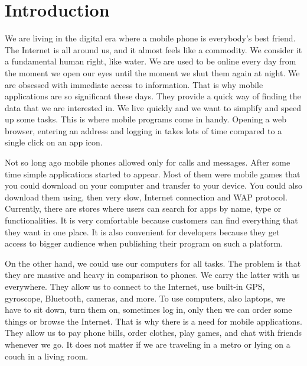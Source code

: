 \chapter{Introduction}
We are living in the digital era where a mobile phone is everybody's best friend. The Internet is all around us, and it almost feels like a commodity. We consider it a fundamental human right, like water. We are used to be online every day from the moment we open our eyes until the moment we shut them again at night. We are obsessed with immediate access to information. That is why mobile applications are so significant these days. They provide a quick way of finding the data that we are interested in. We live quickly and we want to simplify and speed up some tasks. This is where mobile programs come in handy. Opening a web browser, entering an address and logging in takes lots of time compared to a single click on an app icon.

Not so long ago mobile phones allowed only for calls and messages. After some time simple applications started to appear. Most of them were mobile games that you could download on your computer and transfer to your device. You could also download them using, then very slow, Internet connection and WAP protocol. Currently, there are stores where users can search for apps by name, type or functionalities. It is very comfortable because customers can find everything that they want in one place. It is also convenient for developers because they get access to bigger audience when publishing their program on such a platform.

On the other hand, we could use our computers for all tasks. The problem is that they are massive and heavy in comparison to phones. We carry the latter with us everywhere. They allow us to connect to the Internet, use built-in GPS, gyroscope, Bluetooth, cameras, and more. To use computers, also laptops, we have to sit down, turn them on, sometimes log in, only then we can order some things or browse the Internet. That is why there is a need for mobile applications. They allow us to pay phone bills, order clothes, play games, and chat with friends whenever we go. It does not matter if we are traveling in a metro or lying on a couch in a living room.

